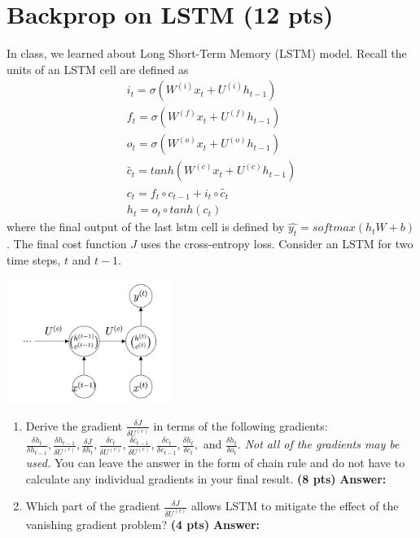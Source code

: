 \documentclass{assignment format}
\newenvironment{answer}{
    {\bf Answer:} \begingroup\color{red}
}{\endgroup}%
\begin{document}
\section{Backprop on LSTM (12 pts)}
In class, we learned about Long Short-Term Memory (LSTM) model. Recall the units of an LSTM cell are defined as
\begin{align*}
i_{t}=\sigma(W^{(i)}x_{t} + U^{(i)}h_{t-1})\\
f_{t}=\sigma(W^{(f)}x_{t} + U^{(f)}h_{t-1})\\
o_{t}=\sigma(W^{(o)}x_{t} + U^{(o)}h_{t-1})\\
\tilde{c_{t}} = tanh(W^{(c)}x_{t} + U^{(c)}h_{t-1})\\
c_{t} = f_{t}\circ c_{t-1}+i_{t}\circ \tilde{c_{t}}\\
h_{t}=o_{t}\circ tanh(c_{t})
\end{align*}
where the final output of the last lstm cell is defined by $\hat{y_{t}}=softmax(h_{t}W+b)$. The final cost function $J$ uses the cross-entropy loss. Consider an LSTM for two time steps, $t$ and $t-1$.
    \begin{center}
        \captionsetup{width=0.4\textwidth}
        \includegraphics[width=0.4\textwidth]{LSTM.png}
        \label{LSTM-figure}
    \end{center}
\begin{enumerate}[label=(\alph*)]
    \item Derive the gradient $\frac{\delta J}{\delta U^{(c)}}$ in terms of the following gradients: $\frac{\delta h_{t}}{\delta h_{t-1}}, \frac{\delta h_{t-1}}{\delta U^{(c)}}, \frac{\delta J}{\delta h_{t}}, \frac{\delta c_{t}}{\delta U^{(c)}}, \frac{\delta c_{t-1}}{\delta U^{(c)}}, \frac{\delta c_{t}}{\delta c_{t-1}}, \frac{\delta h_{t}}{\delta c_{t}},$ and $\frac{\delta h_{t}}{\delta o_{t}}$. \textit{Not all of the gradients may be used.} You can leave the answer in the form of chain rule and do not have to calculate any individual gradients in your final result. \textbf{(8 pts)}
    \begin{answer}
    \end{answer}
    \item Which part of the gradient $\frac{\delta J}{\delta U^{(c)}}$ allows LSTM to mitigate the effect of the vanishing gradient problem? \textbf{(4 pts)}
    \begin{answer}
    \end{answer}
\end{enumerate}
\end{document}
